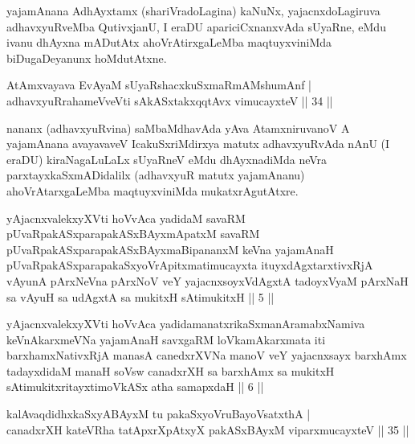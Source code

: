 \begin{artha}
yajamAnana AdhAyxtamx (shariVradoLagina) kaNuNx, yajacnxdoLagiruva adhavxyuRveMba QutivxjanU, I eraDU apariciCxnanxvAda sUyaRne, eMdu ivanu dhAyxna mADutAtx ahoVrAtirxgaLeMba maqtuyxviniMda biDugaDeyanunx hoMdutAtxne.
\end{artha}


\begin{shl}
AtAmxvayava EvAyaM sUyaRshacxkuSxmaRmAMshumAnf |\\
adhavxyuRrahameVveVti sAkASxtakxqqtAvx vimucayxteV \hfill || 34 ||
\end{shl}

\begin{artha}
nananx (adhavxyuRvina) saMbaMdhavAda yAva AtamxniruvanoV A yajamAnana avayavaveV IcakuSxriMdirxya matutx adhavxyuRvAda nAnU (I eraDU) kiraNagaLuLaLx sUyaRneV eMdu dhAyxnadiMda neVra parxtayxkaSxmADidalilx (adhavxyuR matutx yajamAnanu) ahoVrAtarxgaLeMba maqtuyxviniMda mukatxrAgutAtxre.
\end{artha}


\begin{kandikeshl}
yAjacnxvalekxyXVti hoVvAca yadidaM savaRM pUvaRpakASxparapakASx\-BAyxmApatxM savaRM pUvaRpakASxparapakASxBAyxmaBipananxM keVna yajamAnaH pUvaRpakASxparapakaSxyoVrApitxmatimucayxta ituyxdAgxtarxtivxRjA vAyunA \-pArxNeVna pArxNoV veY yajacnxsoyxVdAgxtA tadoyxV\s yaM pArxNaH sa vAyuH sa udAgxtA sa mukitxH sAtimukitxH || 5 ||
\end{kandikeshl}

\begin{kandikeshl}
yAjacnxvalekxyXVti hoVvAca yadidamanatxrikaSxmanAramabxNamiva keVnA\-karxmeVNa yajamAnaH savxgaRM loVkamAkarxmata iti barxhamxNativxRjA manasA canedxrXVNa manoV veY yajacnxsayx barxhAmx tadayxdidaM manaH soV\s sw canadxrXH sa barxhAmx sa mukitxH sAtimukitxritayxtimoVkASx atha samapxdaH || 6 ||
\end{kandikeshl}



\begin{shl}
kalAvaqdidhxkaSxyABAyxM tu pakaSxyoVruBayoVsatxthA |\\
canadxrXH kateVRha tatApxrXpAtxyX pakASxBAyxM viparxmucayxteV \hfill || 35 ||
\end{shl}

